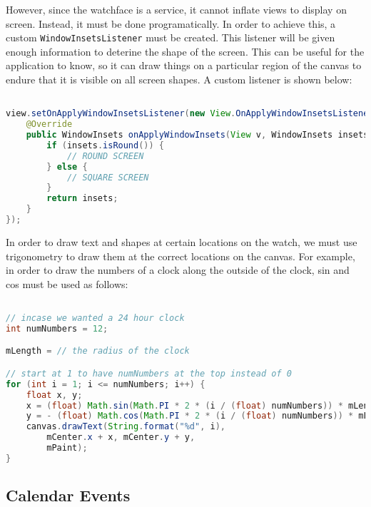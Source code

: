 However, since the watchface is a service, it cannot inflate views to display on
screen. Instead, it must be done programatically. In order to achieve this, a
custom \texttt{WindowInsetsListener} must be created. This listener will be
given enough information to deterine the shape of the screen. This can be useful
for the application to know, so it can draw things on a particular region of the
canvas to endure that it is visible on all screen shapes. A custom listener is
shown below:

\begin{lstlisting}[language=Java]

view.setOnApplyWindowInsetsListener(new View.OnApplyWindowInsetsListener() {
    @Override
    public WindowInsets onApplyWindowInsets(View v, WindowInsets insets) {
        if (insets.isRound()) {
            // ROUND SCREEN
        } else {
            // SQUARE SCREEN
        }
        return insets;
    }
});

\end{lstlisting}

In order to draw text and shapes at certain locations on the watch, we must use
trigonometry to draw them at the correct locations on the canvas. For example,
in order to draw the numbers of a clock along the outside of the clock, sin and
cos must be used as follows:

\clearpage
\begin{lstlisting}[language=Java]

// incase we wanted a 24 hour clock
int numNumbers = 12;

mLength = // the radius of the clock

// start at 1 to have numNumbers at the top instead of 0
for (int i = 1; i <= numNumbers; i++) {
    float x, y;
    x = (float) Math.sin(Math.PI * 2 * (i / (float) numNumbers)) * mLength;
    y = - (float) Math.cos(Math.PI * 2 * (i / (float) numNumbers)) * mLength;
    canvas.drawText(String.format("%d", i),
        mCenter.x + x, mCenter.y + y,
        mPaint);
}

\end{lstlisting}

\subsection{Calendar Events}

